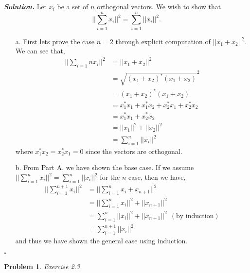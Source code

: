 \documentclass[12pt]{report}
\newtheorem{problem}{Problem}
\newenvironment{solution}[1][\it{Solution}]{\textbf{#1. } }{$\square$}
\begin{document}
\begin{solution}
    \noindent
    Let ${x_i}$ be a set of $n$ orthogonal vectors. We wish to show that $$||\sum_{i=1}^{n}x_i||^2 = \sum_{i=1}^{n}||x_i||^2.$$
    \begin{enumerate}
        \item [a.]
        First lets prove the case $n=2$ through explicit computation of $||x_1 + x_2||^2.$ We can see that,
        \begin{align*}
            ||\sum_{i=1}{n}x_i||^2 &= ||x_1 + x_2||^2\\
            &= \sqrt{(x_1 + x_2)^*(x_1 + x_2)}^2\\
            &= (x_1 + x_2)^*(x_1 + x_2)\\
            &= x_1^*x_1 + x_1^*x_2 + x_2^*x_1 + x_2^*x_2\\
            &= x_1^*x_1 + x_2^*x_2\\
            &=||x_1||^2 + ||x_2||^2\\
            &=\sum_{i=1}^{n}||x_i||^2
        \end{align*} 
        where $x_1^*x_2 = x_2^*x_1 = 0$ since the vectors are orthogonal.
        \item [b.]
        From Part A, we have shown the base case. If we assume $||\sum_{i=1}^{n}x_i||^2 = \sum_{i=1}^{n}||x_i||^2$ for the $n$ case, then we have,
        \begin{align*}
            ||\sum_{i=1}^{n+1}x_i||^2 &= ||\sum_{i=1}^{n}x_i + x_{n+1}||^2\\
            &=||\sum_{i=1}^{n}x_i||^2 + ||x_{n+1}||^2\\
            &=\sum_{i=1}^{n}||x_i||^2 + ||x_{n+1}||^2 ~~ (\text{by induction})\\
            &=\sum_{i=1}^{n+1}||x_{i}||^2
        \end{align*}
        and thus we have shown the general case using induction.
    \end{enumerate}
\end{solution}

\vskip 20pt



\begin{problem}
    Exercise 2.3
\end{problem}
\end{document}

